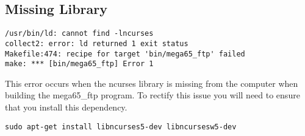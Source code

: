     \subsection{Missing Library}
    \begin{tcolorbox}[colback=black,coltext=white]
\begin{lstlisting}
/usr/bin/ld: cannot find -lncurses
collect2: error: ld returned 1 exit status
Makefile:474: recipe for target 'bin/mega65_ftp' failed
make: *** [bin/mega65_ftp] Error 1\end{lstlisting}
    \end{tcolorbox}
This error occurs when the ncurses library is missing from the computer when building the mega65\_ftp program.
To rectify this issue you will need to ensure that you install this dependency.

    \begin{tcolorbox}[colback=black,coltext=white]
\begin{lstlisting}
sudo apt-get install libncurses5-dev libncursesw5-dev\end{lstlisting}
    \end{tcolorbox}

